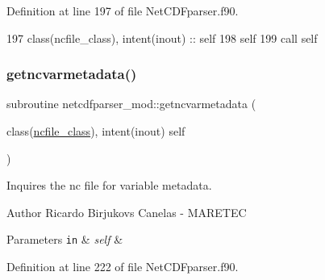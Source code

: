 Definition at line 197 of file Net\+C\+D\+Fparser.\+f90.


\begin{DoxyCode}
197     \textcolor{keywordtype}{class}(ncfile\_class), \textcolor{keywordtype}{intent(inout)} :: self
198     self%
199     \textcolor{keyword}{call }self%
\end{DoxyCode}
\mbox{\label{namespacenetcdfparser__mod_a46989199271acb6205cc61ac413d5a56}} 
\subsubsection{\texorpdfstring{getncvarmetadata()}{getncvarmetadata()}}
{\footnotesize\ttfamily subroutine netcdfparser\+\_\+mod\+::getncvarmetadata (\begin{DoxyParamCaption}\item[{class(\mbox{\hyperlink{structnetcdfparser__mod_1_1ncfile__class}{ncfile\+\_\+class}}), intent(inout)}]{self }\end{DoxyParamCaption})\hspace{0.3cm}{\ttfamily [private]}}



Inquires the nc file for variable metadata. 

\begin{DoxyAuthor}{Author}
Ricardo Birjukovs Canelas -\/ M\+A\+R\+E\+T\+EC 
\end{DoxyAuthor}

\begin{DoxyParams}[1]{Parameters}
\mbox{\tt in}  & {\em self} & \\
\hline
\end{DoxyParams}


Definition at line 222 of file Net\+C\+D\+Fparser.\+f90.


